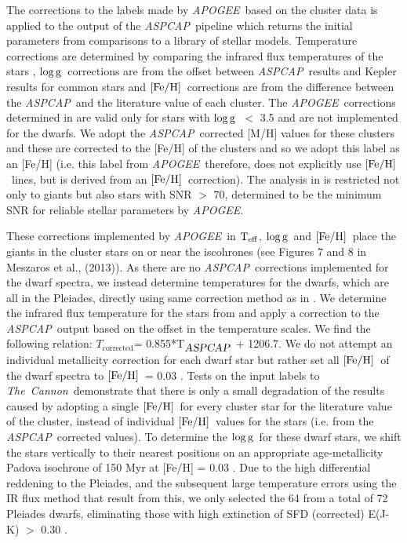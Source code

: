 \documentclass[12pt, preprint]{aastex}
\newcommand{\teff}{\mbox{$\rm T_{eff}$}}
\newcommand{\feh}{\mbox{$\rm [Fe/H]$}}
\newcommand{\logg}{\mbox{$\rm \log g$}}
\newcommand{\tc}{\textsl{The~Cannon}}
\newcommand{\apogee}{\textsl{APOGEE}}
\newcommand{\aspcap}{\textsl{ASPCAP}}
\begin{document}
The corrections to the labels made by \apogee\ based on the cluster data is applied to the output of the \aspcap\ pipeline which returns the initial parameters from comparisons to a library of stellar models. Temperature corrections are determined by comparing the infrared flux temperatures of the stars \citep{gonzalez2009}, \logg\ corrections are from the offset between \aspcap\ results and Kepler results for common stars and \feh\ corrections are from the difference between the \aspcap\ and  the literature value of each cluster.  The \apogee\ corrections determined in \citet{Meszaros2013} are valid only for stars with \logg\ $<$ 3.5 and are not implemented for the dwarfs.  We adopt the \aspcap\ corrected [M/H] values for these clusters and these are corrected to the [Fe/H] of the clusters and so we adopt this label as an [Fe/H] (i.e. this label from \apogee\ therefore, does not explicitly use \feh\ lines, but is derived from an \feh\ correction). The analysis in \citet{Meszaros2013} is restricted not only to giants but also stars with SNR $>$ 70, determined to be the minimum SNR for reliable stellar parameters by \apogee.

These corrections implemented by \apogee\ in \teff, \logg\ and  \feh\ place the giants in the cluster stars on or near the iscohrones (see Figures 7 and 8 in Meszaros et al., (2013)).  As there are no \aspcap\ corrections implemented for the dwarf spectra, we instead determine temperatures for the dwarfs, which are all in the Pleiades, directly using same correction method as in \citet{Meszaros2013}. We determine the infrared flux temperature for the stars from \citet{gonzalez2009} and apply a correction to the \aspcap\ output based on the offset in the temperature scales. We find the following relation: $T_{\mbox{corrected}}$= 0.855*T$_{\mbox{\textit{\aspcap}}}$ + 1206.7.
We do not attempt an individual metallicity correction for each dwarf star but rather set all \feh\ of the dwarf spectra to \feh\ = 0.03 \citep{barrado2001}.
Tests on the input labels to \tc\ demonstrate that there is only a small degradation of the results caused by adopting a single \feh\ for every cluster star for the literature value of the cluster, instead of individual \feh\ values for the stars (i.e. from the \aspcap\ corrected values). To determine the \logg\ for these dwarf stars, we shift the stars vertically to their nearest positions on an appropriate age-metallicity Padova isochrone of 150 Myr at [Fe/H] = 0.03 \citep{girardi2000}. Due to the high differential reddening to the Pleiades, and the subsequent large temperature errors using the IR flux method that result from this, we only selected the 64 from a total of 72 Pleiades dwarfs, eliminating those with high extinction of SFD (corrected) E(J-K) $>$ 0.30 \citep{Schlafly2011}.
\end{document}
